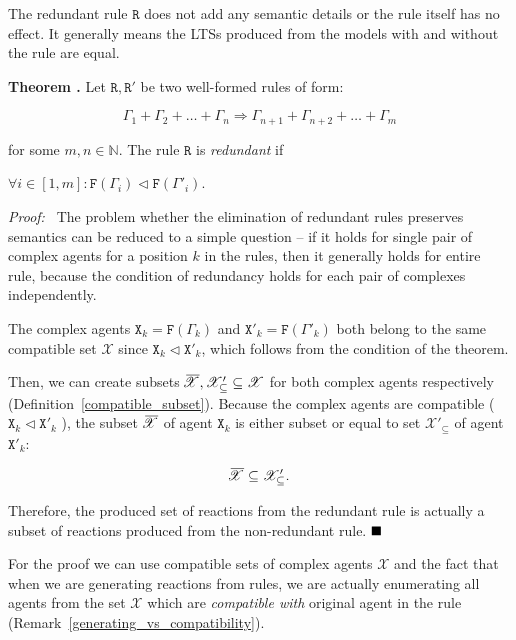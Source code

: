 \documentclass[12pt]{fithesis2}
\newcounter{counter}[section]
\renewcommand{\thecounter}{\thesection.\arabic{counter}}
\newenvironment{proof}{\noindent\textit{Proof:~ }\nopagebreak}{\bigskip}
\newenvironment{theorem}{\bigskip\refstepcounter{counter}\noindent\textbf{Theorem \thecounter }\nopagebreak}{\bigskip}
\newcommand*{\QEDA}{\hfill\ensuremath{\blacksquare}}%
\begin{document}
The redundant rule $\mathtt{R}$ does not add any semantic details or the rule itself has no effect. It generally means the LTSs produced from the models with and without the rule are equal.

\begin{theorem}
\label{redundant_if}
Let $\mathtt{R}, \mathtt{R}'$ be two well-formed rules of form:

$$ \Gamma_1 + \Gamma_2 + \ldots + \Gamma_n \Rightarrow \Gamma_{n+1} + \Gamma_{n+2} + \ldots + \Gamma_{m} $$

for some $m,n \in \mathbb{N}$. The rule $\mathtt{R}$ is \emph{redundant} if

\begin{center}
$ \forall i \in [ 1, m ]: \mathtt{F}(\Gamma_i) \lhd \mathtt{F}(\Gamma'_i). $
\end{center}
\end{theorem}

\begin{proof}
The problem whether the elimination of redundant rules preserves semantics can be reduced to a simple question -- if it holds for single pair of complex agents for a position $k$ in the rules, then it generally holds for entire rule, because the condition of redundancy holds for each pair of complexes independently.

The complex agents $\mathtt{X}_k = \mathtt{F}(\Gamma_k)$ and $\mathtt{X}'_k = \mathtt{F}(\Gamma'_k)$ both belong to the same compatible set $\mathscr{X}$ since $\mathtt{X}_k \lhd \mathtt{X}'_k$, which follows from the condition of the theorem. 

Then, we can create subsets $\mkern2mu\overline{\mkern-4.5mu \mathscr{X}}, \mathscr{X}'_\subseteq \subseteq \mathscr{X}$ for both complex agents respectively (Definition~\ref{compatible_subset}). Because the complex agents are compatible ($\mathtt{X}_k \lhd \mathtt{X}'_k$ ), the subset $\mkern2mu\overline{\mkern-4.5mu \mathscr{X}}$ of agent $\mathtt{X}_k$ is either subset or equal to set $\mathscr{X}'_\subseteq$ of agent $\mathtt{X}'_k$:

$$\mkern2mu\overline{\mkern-4.5mu \mathscr{X}} \subseteq \mathscr{X}'_\subseteq.$$

Therefore, the produced set of reactions from the redundant rule is actually a subset of reactions produced from the non-redundant rule. $\QEDA$
\end{proof}

For the proof we can use compatible sets of complex agents $\mathscr{X}$ and the fact that when we are generating reactions from rules, we are actually enumerating all agents from the set $\mathscr{X}$ which are \emph{compatible with} original agent in the rule (Remark~\ref{generating_vs_compatibility}).
\end{document}
